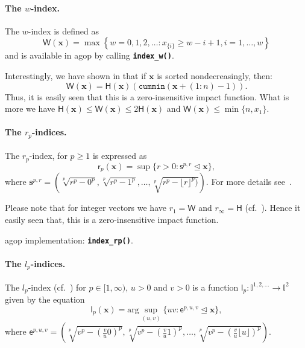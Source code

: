 \documentclass[11pt]{article}\usepackage[]{graphicx}\usepackage[]{color}
\newcommand{\hlkwd}[1]{\textcolor[rgb]{0.737,0.353,0.396}{\textbf{#1}}}%
\newcommand{\package}[1]{\textsf{#1}\xspace}
\newcommand{\Rfunc}[1]{\texttt{\hlkwd{#1}}}
\newcommand{\vect}[1]{{\mathbf{#1}}}
\newcommand{\func}[1]{{\mathsf{#1}}}
\newcommand{\IvalPow}[1]{\mathbb{I}^{#1}}
\newcommand{\AnyPow}{^{1,2,\dots}}
\newcommand{\IvalAnyPow}{\mathbb{I}\AnyPow}
\theoremstyle{remark}
\theoremstyle{definition}
\begin{document}
\paragraph{The $w$-index.}
The $w$-index \cite{Woeginger2008:axiomatich}
is  defined as
\begin{equation*}\label{Eq:IndexW}
\func{W}(\vect{x}) = \max\left\{w=0,1,2,\ldots: {x}_{\{i\}} \ge w-i+1, i=1,\dots,w\right\}
\end{equation*}
and is available in \package{agop} by calling
\index{\Rfunc{index\_w()}}\Rfunc{index\_w()}.

Interestingly, we have shown in \cite{GagolewskiMesiar2014:integrals}
that if $\vect{x}$ is sorted nondecreasingly, then:
\[
\func{W}(\vect{x}) = \func{H}(\vect{x})(\mathtt{cummin}(\vect{x}+(1:n)-1)).
\]
Thus, it is easily seen that this is a zero-insensitive impact function.
What is more we have $\func{H}(\vect{x})\le\func{W}(\vect{x})\le 2\func{H}(\vect{x})$
and $\func{W}(\vect{x})\le \min\{n, x_{1}\}$.


\paragraph{The $r_p$-indices.} The $r_p$-index, for $p\geqslant 1$ is expressed as
\[
\func{r}_{p}(\vect{x})=\sup{\{r>0: \func{s}^{p,r}\trianglelefteq\vect{x}\}},
\]
where $\vect{s}^{p,r}=\left(\sqrt[p]{r^p-0^p},\sqrt[p]{r^p-1^p},\dots,
\sqrt[p]{r^p-\lfloor r\rfloor ^p)}\right)$. For more details
see~\cite{Gagolewski2011:PhD,GagolewskiGrzegorzewski2009:geometricapproach}.

Please note that for integer vectors we have $r_1=\func{W}$ and $r_\infty=\func{H}$
(cf.~\cite{GagolewskiGrzegorzewski2009:geometricapproach}).
Hence it easily seen that, this is a zero-insensitive impact function.

\package{agop} implementation: \index{\Rfunc{index\_rp()}}\Rfunc{index\_rp()}.

\paragraph{The $l_p$-indices.} The $l_p$-index
(cf.~\cite{Gagolewski2011:PhD,GagolewskiGrzegorzewski2009:geometricapproach})
for $p\in[1,\infty)$, $u>0$ and $v>0$ is a function
$\func{l}_{p}:\IvalAnyPow\to\IvalPow{2}$ given by the equation
\[
\func{l}_{p}(\vect{x})=\mathrm{arg}\sup_{(u,v)}{\{uv: \func{e}^{p,u,v}\trianglelefteq\vect{x}\}},
\]
where $\func{e}^{p,u,v}=\left(\sqrt[p]{v^{p}-(\frac{v}{u}0)^{p}},
\sqrt[p]{v^{p}-(\frac{v}{u}1)^{p}},\dots,\sqrt[p]{v^{p}-(\frac{v}{u}\lfloor u\rfloor)^{p}}\right)$.
\end{document}
